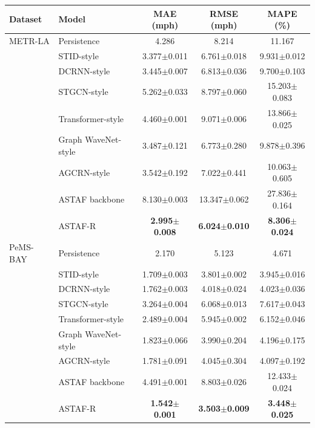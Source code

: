 \begin{tabular}{llccc}
\toprule
Dataset & Model & MAE (mph) & RMSE (mph) & MAPE (\%)\\
\midrule
METR-LA & Persistence & 4.286 & 8.214 & 11.167\\
 & STID-style & 3.377$\pm$0.011 & 6.761$\pm$0.018 & 9.931$\pm$0.012\\
 & DCRNN-style & 3.445$\pm$0.007 & 6.813$\pm$0.036 & 9.700$\pm$0.103\\
 & STGCN-style & 5.262$\pm$0.033 & 8.797$\pm$0.060 & 15.203$\pm$0.083\\
 & Transformer-style & 4.460$\pm$0.001 & 9.071$\pm$0.006 & 13.866$\pm$0.025\\
 & Graph WaveNet-style & 3.487$\pm$0.121 & 6.773$\pm$0.280 & 9.878$\pm$0.396\\
 & AGCRN-style & 3.542$\pm$0.192 & 7.022$\pm$0.441 & 10.063$\pm$0.605\\
 & ASTAF backbone & 8.130$\pm$0.003 & 13.347$\pm$0.062 & 27.836$\pm$0.164\\
 & ASTAF-R & \textbf{2.995$\pm$0.008} & \textbf{6.024$\pm$0.010} & \textbf{8.306$\pm$0.024}\\
\midrule
PeMS-BAY & Persistence & 2.170 & 5.123 & 4.671\\
 & STID-style & 1.709$\pm$0.003 & 3.801$\pm$0.002 & 3.945$\pm$0.016\\
 & DCRNN-style & 1.762$\pm$0.003 & 4.018$\pm$0.024 & 4.023$\pm$0.036\\
 & STGCN-style & 3.264$\pm$0.004 & 6.068$\pm$0.013 & 7.617$\pm$0.043\\
 & Transformer-style & 2.489$\pm$0.004 & 5.945$\pm$0.002 & 6.152$\pm$0.046\\
 & Graph WaveNet-style & 1.823$\pm$0.066 & 3.990$\pm$0.204 & 4.196$\pm$0.175\\
 & AGCRN-style & 1.781$\pm$0.091 & 4.045$\pm$0.304 & 4.097$\pm$0.192\\
 & ASTAF backbone & 4.491$\pm$0.001 & 8.803$\pm$0.026 & 12.433$\pm$0.024\\
 & ASTAF-R & \textbf{1.542$\pm$0.001} & \textbf{3.503$\pm$0.009} & \textbf{3.448$\pm$0.025}\\
\bottomrule
\end{tabular}